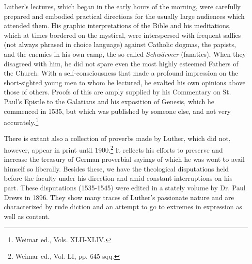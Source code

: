 Luther’s lectures, which began in the early hours of the morning,
were carefully prepared and embodied practical directions for the
usually large audiences which attended them. His graphic interpretations
of the Bible and his meditations, which at times bordered on the
mystical, were interspersed with frequent sallies (not always phrased
in choice language) against Catholic dogmas, the papists, and the
enemies in his own camp, the so-called \textit{Schwärmer} (fanatics). When
they disagreed with him, he did not spare even the most highly esteemed
Fathers of the Church. With a self-consciousness that made a
profound impression on the short-sighted young men to whom he
lectured, he exalted his own opinions above those of others. Proofs
of this are amply supplied by his Commentary on St. Paul’s Epistle to
the Galatians and his exposition of Genesis, which he commenced in
1535, but which was published by someone else, and not very accurately.\footnote{Weimar ed., Vols. XLII-XLIV.}


There is extant also a collection of proverbs made by Luther, which
did not, however, appear in print until 1900.\footnote{Weimar ed., Vol. LI, pp. 645 sqq.}
 It reflects his efforts
to preserve and increase the treasury of German proverbial sayings
of which he was wont to avail himself so liberally. Besides these, we
have the theological disputations held before the faculty under
his direction and amid constant interruptions on his part. These disputations
(1535-1545) were edited in a stately volume by Dr. Paul
Drews in 1896. They show many traces of Luther’s passionate nature
and are characterized by rude diction and an attempt to go to extremes
in expression as well as content.

